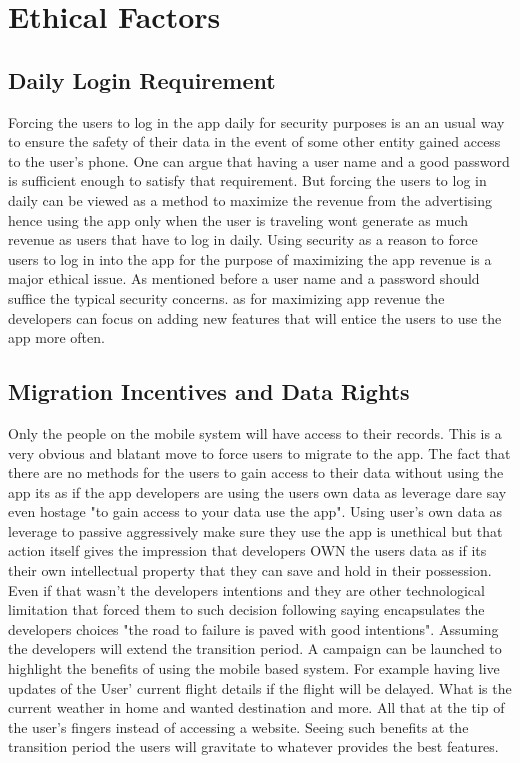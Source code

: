 \documentclass{article}
\begin{document}
\newpage

\section{Ethical Factors}
\subsection{Daily Login Requirement}
Forcing the users to log in the app daily for security purposes is an an usual way to ensure the safety of their data in the event of some other entity gained access to the user's phone. One can argue that having a user name and a good password is sufficient enough to satisfy that requirement. But forcing the users to log in daily can be viewed as a method to maximize the revenue from the advertising hence using the app only when the user is traveling wont generate as much revenue as users that have to log in daily. Using security as a reason to force users to log in into the app for the purpose of maximizing the app revenue is a major ethical issue. As mentioned before a user name and a password should suffice the typical security concerns. as for maximizing app revenue the developers can focus on adding new features that will entice the users to use the app more often. 




\subsection{Migration Incentives and Data Rights}
Only the people on the mobile system will have access to their records. This is a very obvious and blatant move to force users to migrate to the app. The fact that there are no methods for the users to gain access to their data without using the app its as if the app developers are using the users own data as leverage dare say even hostage "to gain access to your data use the app". Using user's own data as leverage to passive aggressively make sure they use the app is unethical but that action itself gives the impression that developers OWN the users data as if its their own intellectual property that they can save and hold in their possession. Even if that wasn't the developers intentions and they are other technological limitation that forced them to such decision following saying encapsulates the developers choices "the road to failure is paved with good intentions". Assuming the developers will extend the transition period. A campaign can be launched to highlight the benefits of using the mobile based system. For example having live updates of the User' current flight details if the flight will be delayed. What is the current weather in home and wanted destination and more. All that at the tip of the user's fingers instead of accessing a website. Seeing such benefits at the transition period the users will gravitate to whatever provides the best features. 
\end{document}
